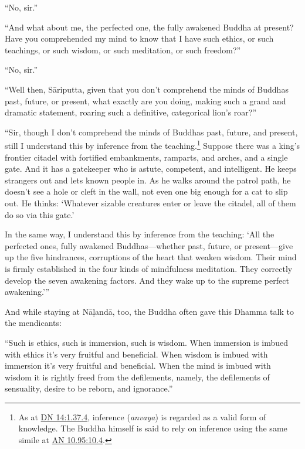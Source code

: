 \documentclass[12pt,openany]{book}%
\begin{document}
“No, sir.” 

“And what about me, the perfected one, the fully awakened Buddha at present? Have you comprehended my mind to know that I have such ethics, or such teachings, or such wisdom, or such meditation, or such freedom?” 

“No, sir.” 

“Well then, \textsanskrit{Sāriputta}, given that you don’t comprehend the minds of Buddhas past, future, or present, what exactly are you doing, making such a grand and dramatic statement, roaring such a definitive, categorical lion’s roar?” 

“Sir, though I don’t comprehend the minds of Buddhas past, future, and present, still I understand this by inference from the teaching.\footnote{As at \href{https://suttacentral.net/dn14/en/sujato\#1.37.4}{DN 14:1.37.4}, inference (\textit{anvaya}) is regarded as a valid form of knowledge. The Buddha himself is said to rely on inference using the same simile at \href{https://suttacentral.net/an10.95/en/sujato\#10.4}{AN 10.95:10.4}. } Suppose there was a king’s frontier citadel with fortified embankments, ramparts, and arches, and a single gate. And it has a gatekeeper who is astute, competent, and intelligent. He keeps strangers out and lets known people in. As he walks around the patrol path, he doesn’t see a hole or cleft in the wall, not even one big enough for a cat to slip out. He thinks: ‘Whatever sizable creatures enter or leave the citadel, all of them do so via this gate.’ 

In the same way, I understand this by inference from the teaching: ‘All the perfected ones, fully awakened Buddhas—whether past, future, or present—give up the five hindrances, corruptions of the heart that weaken wisdom. Their mind is firmly established in the four kinds of mindfulness meditation. They correctly develop the seven awakening factors. And they wake up to the supreme perfect awakening.’” 

And while staying at \textsanskrit{Nāḷandā}, too, the Buddha often gave this Dhamma talk to the mendicants: 

“Such is ethics, such is immersion, such is wisdom. When immersion is imbued with ethics it’s very fruitful and beneficial. When wisdom is imbued with immersion it’s very fruitful and beneficial. When the mind is imbued with wisdom it is rightly freed from the defilements, namely, the defilements of sensuality, desire to be reborn, and ignorance.” 
\end{document}
